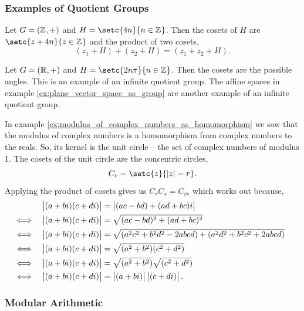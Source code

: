 \documentclass[MathsNotesBase.tex]{subfiles}
\begin{document}
{	\subsubsection{Examples of Quotient Groups}
	\begin{exe}
		\item{Let ${ G = (\mathbb{Z}^{}, +) }$ and ${ H = \setc{4n}{n \in \Z{}} }$. Then the cosets of $H$ are ${ \setc{z + 4n}{z \in \Z{}} }$ and the product of two cosets,
			\[ (z_1 + H) + (z_2 + H) = (z_1 + z_2 + H). \]
		}
		\item{Let ${ G = (\mathbb{R}^{}, +) }$ and ${ H = \setc{2n\pi}{n \in \Z{}} }$. Then the cosets are the possible angles. This is an example of an infinite quotient group. The affine spaces in example \ref{ex:plane_vector_space_as_group} are another example of an infinite quotient group.}
		\medskip
		\item{In example \ref{ex:modulus_of_complex_numbers_as_homomorphism} we saw that the modulus of complex numbers is a homomorphism from complex numbers to the reals. So, its kernel is the unit circle -- the set of complex numbers of modulus 1. The cosets of the unit circle are the concentric circles,
			\[ C_r = \setc{z}{ \abs{z} = r }. \]
		Applying the product of cosets gives us ${ C_rC_s = C_{rs} }$ which works out because,
		\begin{align*}
		&& \left\lvert(a + bi)(c + di)\right\rvert &= \left\lvert(ac - bd) + (ad + bc)i\right\rvert \\
		&\iff & \left\lvert(a + bi)(c + di)\right\rvert &= \sqrt{(ac - bd)^2 + (ad + bc)^2} &\text{\scriptsize{}} \\
		&\iff & \left\lvert(a + bi)(c + di)\right\rvert &= \sqrt{(a^2c^2 + b^2d^2 - 2abcd) + (a^2d^2 + b^2c^2 + 2abcd)} \\
		&\iff & \left\lvert(a + bi)(c + di)\right\rvert &= \sqrt{(a^2 + b^2)(c^2 + d^2)} \\
		&\iff & \left\lvert(a + bi)(c + di)\right\rvert &= \sqrt{(a^2 + b^2)}\sqrt{(c^2 + d^2)} \\
		&\iff & \left\lvert(a + bi)(c + di)\right\rvert &= \left\lvert(a + bi)\right\rvert\left\lvert(c + di)\right\rvert. \\
		\end{align*}
		}
	\end{exe}

	
	\bigskip
	\subsubsection{Modular Arithmetic}
}
\end{document}
